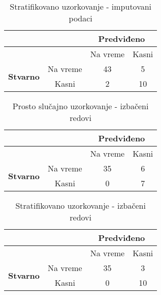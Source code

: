 \documentclass{article}
\begin{document}
\begin{table}[H]
    \centering
    \begin{tabular}{|c|c|c|c|}
        \hline
        \multicolumn{2}{|c|}{} & \multicolumn{2}{c|}{\textbf{Predviđeno}} \\
        \hline
        \multicolumn{2}{|c|}{} & Na vreme & Kasni \\
        \hline
        \multirow{2}{*}{\textbf{Stvarno}} & Na vreme & 43 & 5 \\
        \cline{2-4}
         & Kasni & 2 & 10 \\
        \hline
    \end{tabular}
    \caption{Stratifikovano uzorkovanje - imputovani podaci}
    \label{table:confusion_matrix2}
\end{table}

\begin{table}[H]
    \centering
    \begin{tabular}{|c|c|c|c|}
        \hline
        \multicolumn{2}{|c|}{} & \multicolumn{2}{c|}{\textbf{Predviđeno}} \\
        \hline
        \multicolumn{2}{|c|}{} & Na vreme & Kasni \\
        \hline
        \multirow{2}{*}{\textbf{Stvarno}} & Na vreme & 35 & 6 \\
        \cline{2-4}
         & Kasni & 0 & 7 \\
        \hline
    \end{tabular}
    \caption{Prosto slučajno uzorkovanje - izbačeni redovi}
    \label{table:confusion_matrix3}
\end{table}

\begin{table}[H]
    \centering
    \begin{tabular}{|c|c|c|c|}
        \hline
        \multicolumn{2}{|c|}{} & \multicolumn{2}{c|}{\textbf{Predviđeno}} \\
        \hline
        \multicolumn{2}{|c|}{} & Na vreme & Kasni \\
        \hline
        \multirow{2}{*}{\textbf{Stvarno}} & Na vreme & 35 & 3 \\
        \cline{2-4}
         & Kasni & 0 & 10 \\
        \hline
    \end{tabular}
    \caption{Stratifikovano uzorkovanje - izbačeni redovi}
    \label{table:confusion_matrix4}
\end{table}

\newpage
\end{document}
